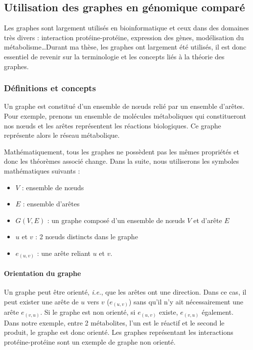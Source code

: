 \subsection{Utilisation des graphes en génomique comparé}

Les graphes sont largement utilisés en bioinformatique \cite{pavlopoulos_using_2011} et ceux dans des domaines très divers : interaction protéine-protéine, expression des gènes, modélisation du métabolisme\dots  Durant ma thèse, les graphes ont largement été utilisés, il est donc essentiel de revenir sur la terminologie et les concepts liés à la théorie des graphes.

\subsubsection{Définitions et concepts}

Un graphe est constitué d'un ensemble de n\oe uds relié par un ensemble d'arêtes. Pour exemple, prenons un ensemble de molécules métaboliques qui constitueront nos n\oe uds et les arêtes représentent les réactions biologiques. Ce graphe représente alors le réseau métabolique.

Mathématiquement, tous les graphes ne possèdent pas les mêmes propriétés et donc les théorèmes associé change. Dans la suite, nous utiliserons les symboles mathématiques suivants :
\begin{itemize}
    \item $V$ : ensemble de n\oe uds
    \item $E$ : ensemble d'arêtes
    \item $G(V, E)$ : un graphe composé d'un ensemble de n\oe uds $V$ et d'arête $E$
    \item $u$ et $v$ : 2 n\oe uds distincts dans le graphe
    \item $e_{(u,v)}$ : une arête reliant $u$ et $v$.
\end{itemize}

\paragraph{Orientation du graphe}

Un graphe peut être orienté, \textit{i.e.}, que les arêtes ont une direction. Dans ce cas, il peut exister une arête de $u$ vers $v$ ($e_{(u, v)}$) sans qu'il n'y ait nécessairement une arête $e_{(v, u)}$. Si le graphe est non orienté, si $e_{(u, v)}$ existe, $e_{(v, u)}$ également. Dans notre exemple, entre 2 métabolites, l'un est le réactif et le second le produit, le graphe est donc orienté. Les graphes représentant les interactions protéine-protéine sont un exemple de graphe non orienté.

